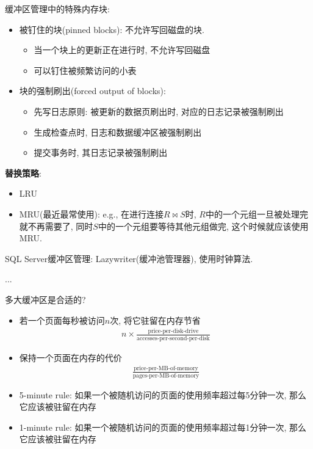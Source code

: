 缓冲区管理中的特殊内存块:
\begin{itemize}
    \item 被钉住的块(pinned blocks): 不允许写回磁盘的块.
    \begin{itemize}
        \item 当一个块上的更新正在进行时, 不允许写回磁盘
        \item 可以钉住被频繁访问的小表
    \end{itemize}
    \item 块的强制刷出(forced output of blocks):
    \begin{itemize}
        \item 先写日志原则: 被更新的数据页刷出时, 对应的日志记录被强制刷出
        \item 生成检查点时, 日志和数据缓冲区被强制刷出
        \item 提交事务时, 其日志记录被强制刷出
    \end{itemize}
\end{itemize}


\textbf{替换策略}:
\begin{itemize}
    \item LRU
    \item MRU(最近最常使用): e.g., 在进行连接$R \bowtie S$时, $R$中的一个元组一旦被处理完就不再需要了, 同时$S$中的一个元组要等待其他元组做完, 这个时候就应该使用MRU.
\end{itemize}

SQL Server缓冲区管理: Lazywriter(缓冲池管理器), 使用时钟算法.

...

多大缓冲区是合适的?
\begin{itemize}
    \item 若一个页面每秒被访问$n$次, 将它驻留在内存节省
    \begin{align*}
        n \times \frac{\text{price-per-disk-drive}}{\text{accesses-per-second-per-disk}}
    \end{align*}
    \item 保持一个页面在内存的代价
    \begin{align*}
        \frac{\text{price-per-MB-of-memory}}{\text{pages-per-MB-of-memory}}
    \end{align*}
    \item 5-minute rule: 如果一个被随机访问的页面的使用频率超过每5分钟一次, 那么它应该被驻留在内存
    \item 1-minute rule: 如果一个被随机访问的页面的使用频率超过每1分钟一次, 那么它应该被驻留在内存
\end{itemize}


